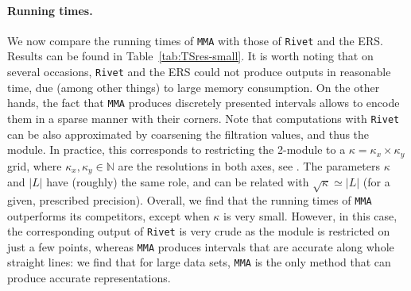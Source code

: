 \documentclass{article}
\newcommand{\RIVET}{\texttt{Rivet}}
\newcommand{\MMA}{\texttt{MMA}}
\begin{document}
\paragraph*{Running times.} %
We now compare the running times of \MMA{} with those of \RIVET{} and the ERS.
Results can be found in Table~\ref{tab:TSres-small}. It is worth noting that on
several occasions, \RIVET{} and the ERS could not produce outputs in reasonable
time, due (among other things) to large memory consumption. On the other hands,
the fact that \MMA{} produces discretely presented intervals allows to encode them in a sparse manner with their corners.
Note that computations with \RIVET{} can be also approximated by coarsening the
filtration values, and thus the module. In practice, this corresponds to
restricting the 2-module to a $\kappa = \kappa_x\times \kappa_y$ grid, where
$\kappa_x, \kappa_y \in \mathbb N$ are the resolutions in both axes, see \cite[Section 8.2]{lesnickInteractiveVisualization2D2015}.
The parameters $\kappa$ and $|L|$ have (roughly) the same role, and can be related  with $\sqrt \kappa \simeq |L|$ (for a given, prescribed precision). %
Overall, we find that the running times of \MMA{} outperforms its competitors, except when
$\kappa$ is very small.
However, in this case, %
the corresponding output of \RIVET{} is very crude as the module is restricted on just a few points,
whereas \MMA{} produces intervals that are accurate along whole straight lines:
we find that for large data sets, \MMA{} is the only method that can produce accurate representations.
\end{document}
